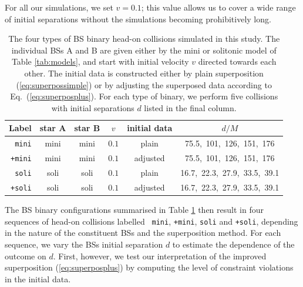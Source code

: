 \documentclass[]{iopart}
\begin{document}
For all our simulations, we set $v=0.1$; this value allows us to
cover a wide range of initial separations without the simulations
becoming prohibitively long.
%
\begin{table}[t]
    \centering
    \caption{
    The four types of BS binary head-on collisions simulated in
    this study. The individual BSs A and B are given either by the
    mini or solitonic model of Table \ref{tab:models}, and start
    with initial velocity $v$ directed towards each other. The
    initial data is constructed either by plain superposition
    (\ref{eq:superpossimple}) or by adjusting the superposed data
    according to Eq.~(\ref{eq:superposplus}).  For each type of
    binary, we perform five collisions with initial separations $d$
    listed in the final column.
    }
    \begin{tabular}{r|ccccc}
    \hline
    Label & star A & star B & $v$ & initial data & $d/M$ \\
    \hline
    {\tt mini} & mini & mini & $0.1$ & plain &
    75.5,~101,~126,~151,~176 \\
    {\tt +mini}& mini & mini & $0.1$ & adjusted &
    75.5,~101,~126,~151,~176 \\
    {\tt soli} & soli & soli & $0.1$ & plain &
    16.7,~22.3,~27.9,~33.5,~39.1 \\
    {\tt +soli} & soli & soli & $0.1$ &
    adjusted &
    16.7,~22.3,~27.9,~33.5,~39.1 \\
    \hline
    \end{tabular}
    \label{tab:hods}
\end{table}
%
The BS binary configurations summarised in Table \ref{tab:hods}
then result in four sequences of head-on collisions labelled {\tt
mini}, {\tt +mini}, {\tt soli} and {\tt +soli}, depending in the
nature of the constituent BSs and the superposition method. For
each sequence, we vary the BSs initial separation $d$ to estimate
the dependence of the outcome on $d$. First, however, we test our
interpretation of the improved superposition (\ref{eq:superposplus})
by computing the level of constraint violations in the initial data.


\end{document}
